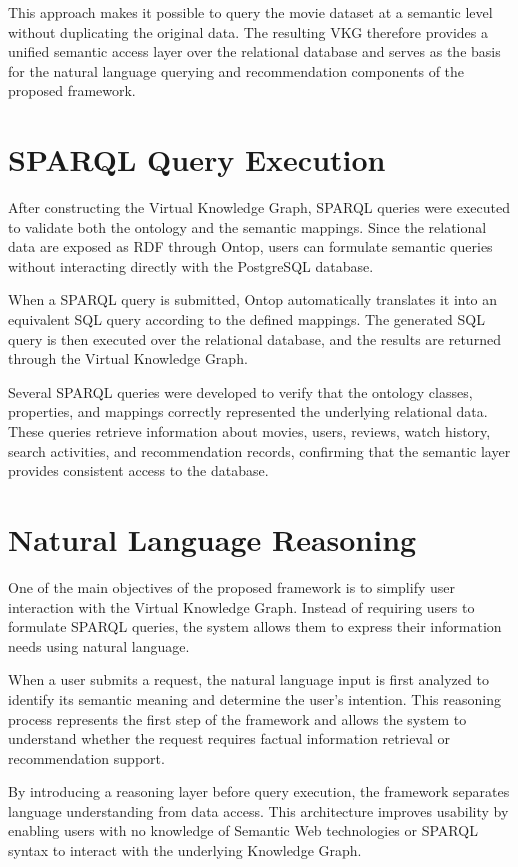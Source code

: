 This approach makes it possible to query the movie dataset at a semantic level without duplicating the original data. The resulting VKG therefore provides a unified semantic access layer over the relational database and serves as the basis for the natural language querying and recommendation components of the proposed framework.
\section{SPARQL Query Execution}

After constructing the Virtual Knowledge Graph, SPARQL queries were executed to validate both the ontology and the semantic mappings. Since the relational data are exposed as RDF through Ontop, users can formulate semantic queries without interacting directly with the PostgreSQL database.

When a SPARQL query is submitted, Ontop automatically translates it into an equivalent SQL query according to the defined mappings. The generated SQL query is then executed over the relational database, and the results are returned through the Virtual Knowledge Graph.

Several SPARQL queries were developed to verify that the ontology classes, properties, and mappings correctly represented the underlying relational data. These queries retrieve information about movies, users, reviews, watch history, search activities, and recommendation records, confirming that the semantic layer provides consistent access to the database.
\section{Natural Language Reasoning}

One of the main objectives of the proposed framework is to simplify user interaction with the Virtual Knowledge Graph. Instead of requiring users to formulate SPARQL queries, the system allows them to express their information needs using natural language.

When a user submits a request, the natural language input is first analyzed to identify its semantic meaning and determine the user's intention. This reasoning process represents the first step of the framework and allows the system to understand whether the request requires factual information retrieval or recommendation support.

By introducing a reasoning layer before query execution, the framework separates language understanding from data access. This architecture improves usability by enabling users with no knowledge of Semantic Web technologies or SPARQL syntax to interact with the underlying Knowledge Graph.
